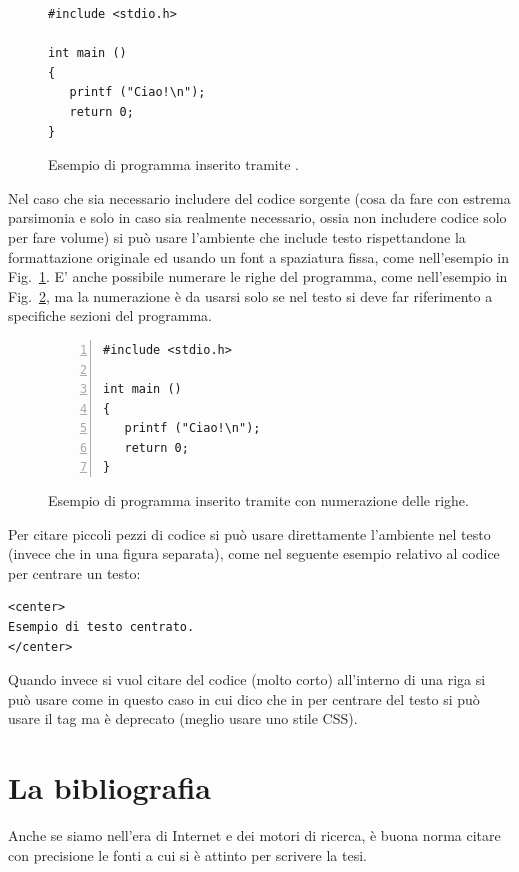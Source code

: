 \begin{figure}[tb]
\HRule
\begin{lstlisting}
#include <stdio.h>

int main ()
{
   printf ("Ciao!\n");
   return 0;
}
\end{lstlisting}
\HRule
\caption{Esempio di programma inserito tramite .\label{fig:prog}}
\end{figure}
Nel caso che sia necessario includere del codice sorgente (cosa da fare con estrema parsimonia e solo in caso sia realmente necessario, ossia non includere codice solo per fare volume) si può usare l'ambiente  che include testo rispettandone la formattazione originale ed usando un font a spaziatura fissa, come nell'esempio in Fig.~\ref{fig:prog}.
E' anche possibile numerare le righe del programma, come nell'esempio in Fig.~\ref{fig:prog-num}, ma la numerazione è da usarsi solo se nel testo si deve far riferimento a specifiche sezioni del programma.

\begin{figure}[tb]
\HRule
\begin{lstlisting}[numbers=left]
#include <stdio.h>

int main ()
{
   printf ("Ciao!\n");
   return 0;
}
\end{lstlisting}
\HRule
\caption{Esempio di programma inserito tramite  con  numerazione delle righe.\label{fig:prog-num}}
\end{figure}

Per citare piccoli pezzi di codice si può usare direttamente l'ambiente  nel testo (invece che in una figura separata), come nel seguente esempio relativo al codice \html per centrare un testo:
\begin{lstlisting}
<center>
Esempio di testo centrato.
</center>
\end{lstlisting}
Quando invece si vuol citare del codice (molto corto) all'interno di una riga si può usare  come in questo caso in cui dico che in \html per centrare del testo si può usare il tag  ma è deprecato (meglio usare uno stile CSS).

\section{La bibliografia}

Anche se siamo nell'era di Internet e dei motori di ricerca, è buona norma citare con precisione le fonti a cui si è attinto per scrivere la tesi. 

